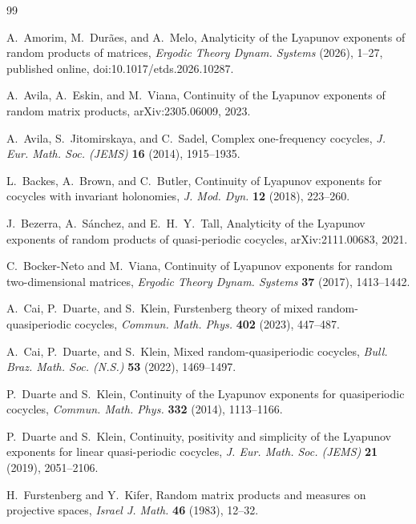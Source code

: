 \documentclass[11pt,a4paper]{amsart}
\begin{document}
\begin{thebibliography}{99}

A.~Amorim, M.~Durães, and A.~Melo,
\newblock Analyticity of the Lyapunov exponents of random products of
matrices,
\newblock \emph{Ergodic Theory Dynam. Systems} (2026), 1--27,
published online, doi:10.1017/etds.2026.10287.

A.~Avila, A.~Eskin, and M.~Viana,
\newblock Continuity of the Lyapunov exponents of random matrix
products,
\newblock arXiv:2305.06009, 2023.

A.~Avila, S.~Jitomirskaya, and C.~Sadel,
\newblock Complex one-frequency cocycles,
\newblock \emph{J. Eur. Math. Soc. (JEMS)} \textbf{16} (2014),
1915--1935.

L.~Backes, A.~Brown, and C.~Butler,
\newblock Continuity of Lyapunov exponents for cocycles with invariant
holonomies,
\newblock \emph{J. Mod. Dyn.} \textbf{12} (2018), 223--260.

J.~Bezerra, A.~Sánchez, and E.~H.~Y.~Tall,
\newblock Analyticity of the Lyapunov exponents of random products of
quasi-periodic cocycles,
\newblock arXiv:2111.00683, 2021.

C.~Bocker-Neto and M.~Viana,
\newblock Continuity of Lyapunov exponents for random two-dimensional
matrices,
\newblock \emph{Ergodic Theory Dynam. Systems} \textbf{37} (2017),
1413--1442.

A.~Cai, P.~Duarte, and S.~Klein,
\newblock Furstenberg theory of mixed random-quasiperiodic cocycles,
\newblock \emph{Commun. Math. Phys.} \textbf{402} (2023), 447--487.

A.~Cai, P.~Duarte, and S.~Klein,
\newblock Mixed random-quasiperiodic cocycles,
\newblock \emph{Bull. Braz. Math. Soc. (N.S.)} \textbf{53} (2022),
1469--1497.

P.~Duarte and S.~Klein,
\newblock Continuity of the Lyapunov exponents for quasiperiodic
cocycles,
\newblock \emph{Commun. Math. Phys.} \textbf{332} (2014), 1113--1166.

P.~Duarte and S.~Klein,
\newblock Continuity, positivity and simplicity of the Lyapunov
exponents for linear quasi-periodic cocycles,
\newblock \emph{J. Eur. Math. Soc. (JEMS)} \textbf{21} (2019),
2051--2106.

H.~Furstenberg and Y.~Kifer,
\newblock Random matrix products and measures on projective spaces,
\newblock \emph{Israel J. Math.} \textbf{46} (1983), 12--32.


\end{thebibliography}
\end{document}
